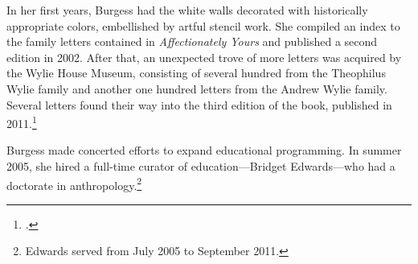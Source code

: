 \documentclass[
  american,
  letterpaper,
]{scrreprt}
\begin{document}
In her first years, Burgess had the white walls decorated with
historically appropriate colors, embellished by artful stencil work. She
compiled an index to the family letters contained in
\emph{Affectionately Yours} and published a second edition in 2002.
After that, an unexpected trove of more letters was acquired by the
Wylie House Museum, consisting of several hundred from the Theophilus
Wylie family and another one hundred letters from the Andrew Wylie
family. Several letters found their way into the third edition of the
book, published in 2011.\footnote{.}

Burgess made concerted efforts to expand educational programming. In
summer 2005, she hired a full-time curator of education---Bridget
Edwards---who had a doctorate in anthropology.\footnote{Edwards served
  from July 2005 to September 2011.}
\end{document}
